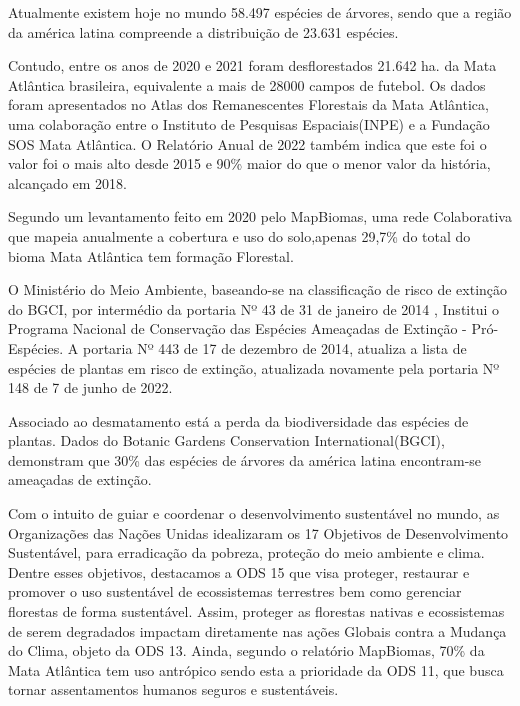 Atualmente existem hoje no mundo 58.497 espécies de árvores, sendo que a região da américa latina compreende a distribuição de 23.631 espécies.\cite{bgci}

Contudo, entre os anos de 2020 e 2021 foram desflorestados 21.642 ha. da Mata Atlântica brasileira, equivalente a mais de 28000 campos de futebol. Os dados foram apresentados no Atlas dos Remanescentes Florestais da Mata Atlântica, uma colaboração entre o Instituto de Pesquisas Espaciais(INPE) e a Fundação SOS Mata Atlântica. O Relatório Anual de 2022 também indica que este foi o valor foi o mais alto desde 2015 e 90\% maior do que o menor valor da história, alcançado em 2018.\cite{atlas-mata-atlantica}

Segundo um levantamento feito  em 2020 pelo MapBiomas, uma rede Colaborativa que mapeia anualmente a cobertura e uso do solo,apenas 29,7\% do total do bioma Mata Atlântica tem formação Florestal.\cite{mapbiomas}

O Ministério do Meio Ambiente, baseando-se na classificação de risco de extinção do BGCI, por intermédio da portaria Nº 43 de 31 de janeiro de 2014 \cite{mma2014},  Institui o Programa Nacional de Conservação das Espécies Ameaçadas de Extinção - Pró-Espécies. A portaria Nº 443 de 17 de dezembro de 2014\cite{mma20142}, atualiza a lista de espécies de plantas em risco de extinção, atualizada novamente pela portaria Nº 148 de 7 de junho de 2022.\cite{mma2022}

Associado ao desmatamento está a perda da biodiversidade das espécies de plantas. Dados do Botanic Gardens Conservation International(BGCI), demonstram que 30\% das espécies de árvores da américa latina encontram-se ameaçadas de extinção.\cite{bgci}

Com o intuito de guiar e coordenar o desenvolvimento sustentável no mundo, as Organizações das Nações Unidas idealizaram os 17 Objetivos de Desenvolvimento Sustentável, para erradicação da pobreza, proteção do meio ambiente e clima. Dentre esses objetivos, destacamos a ODS 15 que visa proteger, restaurar e promover o uso sustentável de ecossistemas terrestres bem como gerenciar florestas de forma sustentável. Assim, proteger as florestas nativas e ecossistemas de serem degradados impactam diretamente nas ações Globais contra a Mudança do Clima, objeto da ODS 13. Ainda, segundo o relatório MapBiomas, 70\% da Mata Atlântica tem uso antrópico sendo esta a prioridade da ODS 11, que busca tornar assentamentos humanos seguros e sustentáveis.\cite{agenda2030}

